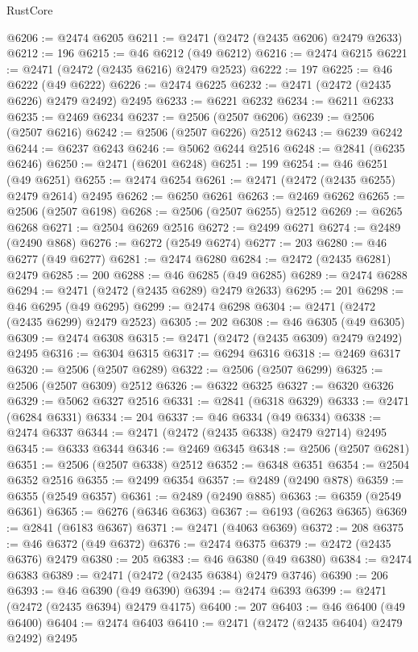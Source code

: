 \begin{lexlean}{RustCore}
\begin{coremodule}
@6206 := @2474 @6205
@6211 := @2471 (@2472 (@2435 @6206) @2479 @2633)
@6212 := 196
@6215 := @46 @6212 (@49 @6212)
@6216 := @2474 @6215
@6221 := @2471 (@2472 (@2435 @6216) @2479 @2523)
@6222 := 197
@6225 := @46 @6222 (@49 @6222)
@6226 := @2474 @6225
@6232 := @2471 (@2472 (@2435 @6226) @2479 @2492) @2495
@6233 := @6221 @6232
@6234 := @6211 @6233
@6235 := @2469 @6234
@6237 := @2506 (@2507 @6206)
@6239 := @2506 (@2507 @6216)
@6242 := @2506 (@2507 @6226) @2512
@6243 := @6239 @6242
@6244 := @6237 @6243
@6246 := @5062 @6244 @2516
@6248 := @2841 (@6235 @6246)
@6250 := @2471 (@6201 @6248)
@6251 := 199
@6254 := @46 @6251 (@49 @6251)
@6255 := @2474 @6254
@6261 := @2471 (@2472 (@2435 @6255) @2479 @2614) @2495
@6262 := @6250 @6261
@6263 := @2469 @6262
@6265 := @2506 (@2507 @6198)
@6268 := @2506 (@2507 @6255) @2512
@6269 := @6265 @6268
@6271 := @2504 @6269 @2516
@6272 := @2499 @6271
@6274 := @2489 (@2490 @868)
@6276 := @6272 (@2549 @6274)
@6277 := 203
@6280 := @46 @6277 (@49 @6277)
@6281 := @2474 @6280
@6284 := @2472 (@2435 @6281) @2479
@6285 := 200
@6288 := @46 @6285 (@49 @6285)
@6289 := @2474 @6288
@6294 := @2471 (@2472 (@2435 @6289) @2479 @2633)
@6295 := 201
@6298 := @46 @6295 (@49 @6295)
@6299 := @2474 @6298
@6304 := @2471 (@2472 (@2435 @6299) @2479 @2523)
@6305 := 202
@6308 := @46 @6305 (@49 @6305)
@6309 := @2474 @6308
@6315 := @2471 (@2472 (@2435 @6309) @2479 @2492) @2495
@6316 := @6304 @6315
@6317 := @6294 @6316
@6318 := @2469 @6317
@6320 := @2506 (@2507 @6289)
@6322 := @2506 (@2507 @6299)
@6325 := @2506 (@2507 @6309) @2512
@6326 := @6322 @6325
@6327 := @6320 @6326
@6329 := @5062 @6327 @2516
@6331 := @2841 (@6318 @6329)
@6333 := @2471 (@6284 @6331)
@6334 := 204
@6337 := @46 @6334 (@49 @6334)
@6338 := @2474 @6337
@6344 := @2471 (@2472 (@2435 @6338) @2479 @2714) @2495
@6345 := @6333 @6344
@6346 := @2469 @6345
@6348 := @2506 (@2507 @6281)
@6351 := @2506 (@2507 @6338) @2512
@6352 := @6348 @6351
@6354 := @2504 @6352 @2516
@6355 := @2499 @6354
@6357 := @2489 (@2490 @878)
@6359 := @6355 (@2549 @6357)
@6361 := @2489 (@2490 @885)
@6363 := @6359 (@2549 @6361)
@6365 := @6276 (@6346 @6363)
@6367 := @6193 (@6263 @6365)
@6369 := @2841 (@6183 @6367)
@6371 := @2471 (@4063 @6369)
@6372 := 208
@6375 := @46 @6372 (@49 @6372)
@6376 := @2474 @6375
@6379 := @2472 (@2435 @6376) @2479
@6380 := 205
@6383 := @46 @6380 (@49 @6380)
@6384 := @2474 @6383
@6389 := @2471 (@2472 (@2435 @6384) @2479 @3746)
@6390 := 206
@6393 := @46 @6390 (@49 @6390)
@6394 := @2474 @6393
@6399 := @2471 (@2472 (@2435 @6394) @2479 @4175)
@6400 := 207
@6403 := @46 @6400 (@49 @6400)
@6404 := @2474 @6403
@6410 := @2471 (@2472 (@2435 @6404) @2479 @2492) @2495

\end{coremodule}
\end{lexlean}

